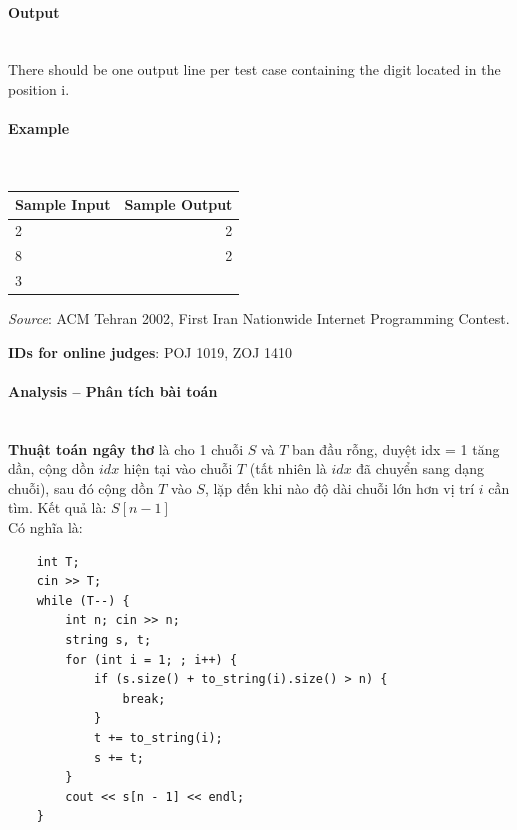 \documentclass{article}
\begin{document}
\paragraph{Output}\mbox{} \\

There should be one output line per test case containing the digit located in the position i.

\paragraph{Example}\mbox{} \\

\begin{table}[h]
    \centering
    \begin{tabular}{|l|r|}
        \hline
        \textbf{Sample Input} & \textbf{Sample Output} \\
        \hline
         2   & 2  \\ 
         8  &  2 \\ 
         3  &  \\ \hline
    \end{tabular}
\end{table}

\textit{Source}: ACM Tehran 2002, First Iran Nationwide Internet Programming Contest.

\textbf{IDs for online judges}: POJ 1019, ZOJ 1410


\paragraph{Analysis -- Phân tích bài toán} \mbox{} \\

\textbf{Thuật toán ngây thơ} là cho 1 chuỗi $S$ và $T$ ban đầu rỗng, duyệt idx = 1 tăng dần, cộng dồn $idx$ hiện tại vào chuỗi $T$ (tất nhiên là $idx$ đã chuyển sang dạng chuỗi), sau đó cộng dồn $T$ vào $S$, lặp đến khi nào độ dài chuỗi lớn hơn vị trí $i$ cần tìm. Kết quả là: $S[n-1]$\\

Có nghĩa là:

\begin{lstlisting}
    int T; 
	cin >> T;
	while (T--) {
		int n; cin >> n;
		string s, t;
		for (int i = 1; ; i++) {
			if (s.size() + to_string(i).size() > n) {
				break;
			}
			t += to_string(i);
			s += t;
		}
		cout << s[n - 1] << endl;
	}
\end{lstlisting}
\end{document}

